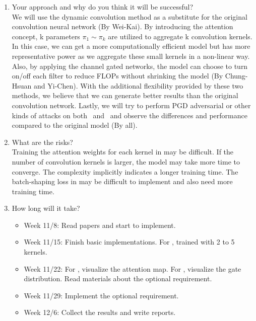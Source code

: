 \documentclass[10pt, journal, onecolumn]{IEEEtran}
\begin{document}
\begin{enumerate}
    \item Your approach and why do you think it will be successful?\\
    We will use the dynamic convolution method as a substitute for the original convolution neural network (By Wei-Kai). 
    By introducing the attention concept, k parameters $\pi_1 \sim \pi_k$ are utilized to aggregate k convolution kernels.
    In this case, we can get a more computationally efficient model but has more representative power as we aggregate these small kernels in a non-linear way.
    Also, by applying the channel gated networks, the model can choose to turn on/off each filter to reduce FLOPs without shrinking the model (By Chung-Hsuan and Yi-Chen).
    With the additional flexibility provided by these two methods, we believe that we can generate better results than the original convolution network.
    Lastly, we will try to perform PGD adversarial or other kinds of attacks on both~\cite{chen2020dynamic} and~\cite{Bejnordi2020Batch-shaping} and observe the differences and performance compared to the original model (By all). 
    \item What are the risks?
        \\
        Training the attention weights for each kernel in \cite{chen2020dynamic} may be difficult. If the number of convolution kernels is larger, the model may take more time to converge. The complexity implicitly indicates a longer training time.
        The batch-shaping loss in \cite{Bejnordi2020Batch-shaping} may be difficult to implement and also need more training time.
    \item How long will it take?
    \begin{itemize}
        \item Week 11/8:  Read papers and start to implement.
        \item Week 11/15: Finish basic implementations.  For \cite{chen2020dynamic}, trained with 2 to 5 kernels. 
        \item Week 11/22: For \cite{chen2020dynamic}, visualize the attention map. For \cite{Bejnordi2020Batch-shaping}, visualize the gate distribution. Read materials about the optional requirement.
        \item Week 11/29: Implement the optional requirement.
        \item Week 12/6: Collect the results and write reports.

\end{itemize}
\end{enumerate}
\end{document}
